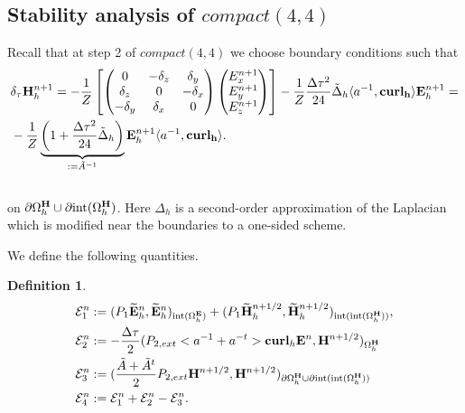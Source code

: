 \documentclass[12pt,reqno]{amsart}
\newcommand{\curl}{{\bf curl}}
\newcommand{\acurl}{\langle a^{-1},{\bf curl_h}\rangle}
\newcommand{\e}{{\bf E}}
\newcommand{\h}{{\bf H}}
\newtheorem{defi}[theorem]{Definition}
\theoremstyle{definition}
\numberwithin{equation}{section}
\newcommand{\intr}[1]{\mathrm{int}(#1)}
\def\Gwh{\Omega_h}
\begin{document}
\subsection{Stability analysis of $compact(4,4)$ }

Recall that at  step 2 of $compact(4,4)$ we choose boundary conditions  such that
\begin{align*}
	&
	\delta_{\tau}\h_h^{n+1}=
			-\frac{1}{Z}
	\left[ 
	\begin{pmatrix}
		0& -\delta_z & \delta _y\\
		\delta_z&0&-\delta_x\\
		-\delta_y&\delta_x&0\\
	\end{pmatrix}
	\begin{pmatrix}
		E_x^{n+1}\\
		E_y^{n+1}\\
		E_z^{n+1}
	\end{pmatrix}\right]
-\frac{1}{Z}\frac{\Delta \tau^2}{24}\tilde{\Delta}_h\acurl  \e_h^{n+1}=\\&
-\frac{1}{Z}
	\underbrace{\left(
		1+\frac{\Delta \tau^2}{24}\tilde{\Delta}_h
		\right)}_{:=\tilde{A}^{-1}}\e_h^{n+1} \acurl.\\&
\end{align*} on $\partial\Gwh^\h\cup \partial \intr{\Gwh^\h}$.
Here $\Delta_h$ is a second-order approximation of the Laplacian which is modified near the boundaries to a one-sided scheme.

	We define the following quantities.
\begin{defi}
	\begin{align*}
		&
		\mathcal{E}_1^{n}:=
		(P_1\widetilde{\e}_h^{n},\widetilde{\e}_h^{n})_{\intr{\Gwh^\e}}+
		(P_1\widetilde{\h}_h^{n+1/2},\widetilde{\h}_h^{n+1/2})_{\intr{\intr{\Gwh^\h}}}, \\&
		\mathcal{E}_2^{n}:=-\frac{\Delta \tau}{2}(P_{2,ext}<a^{-1}+a^{-t}>\curl_h \e^{n},\h^{n+1/2})_{\Gwh^\h}\\&
		\mathcal{E}_3^{n}:=(\frac{\tilde{A}+\tilde{A}^t}{2}P_{2,ext}\h^{n+1/2},\h^{n+1/2})_{\partial \Gwh^\h\cup \partial \intr{\intr{\Gwh^\h}}}\\&
		\mathcal{E}_4^{n}:=\mathcal{E}^n_1+\mathcal{E}^n_2-\mathcal{E}^n_3.
	\end{align*}
\end{defi}
\end{document}
